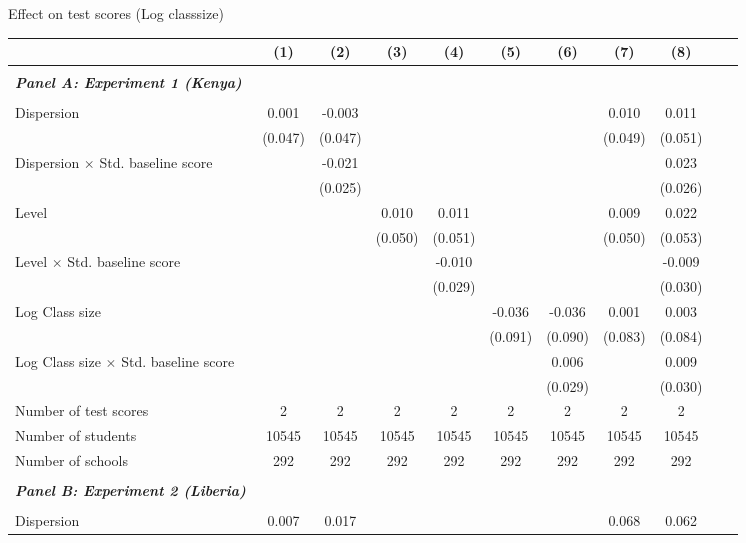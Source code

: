 \begin{center} 
\caption{\small Effect on test scores (Log classsize)} 
\label{tab:descriptives} 
\begin{scriptsize}
\begin{threeparttable}
\begin{tabular} {@{} l l c c c c c c c c c c  @{}} \toprule \toprule
& &(1)&(2)&(3)&(4)&(5)&(6)&(7)&(8) \\ \midrule 
\\
\multicolumn{3}{l}{\textbf{\textit{Panel A: Experiment 1 (Kenya)}}} \\
\\
Dispersion &  & 0.001 & -0.003 &  &  &  &  & 0.010 & 0.011 \\
                 &  & (0.047) & (0.047) &  &  &  &  & (0.049) & (0.051) \\
Dispersion $\times$ Std. baseline score &  &  & -0.021 &  &  &  &  &  & 0.023 \\
                 &  &  & (0.025) &  &  &  &  &  & (0.026) \\
Level &  &  &  & 0.010 & 0.011 &  &  & 0.009 & 0.022 \\
                 &  &  &  & (0.050) & (0.051) &  &  & (0.050) & (0.053) \\
Level $\times$ Std. baseline score &  &  &  &  & -0.010 &  &  &  & -0.009 \\
                 &  &  &  &  & (0.029) &  &  &  & (0.030) \\
Log Class size &  &  &  &  &  & -0.036 & -0.036 & 0.001 & 0.003 \\
                 &  &  &  &  &  & (0.091) & (0.090) & (0.083) & (0.084) \\
Log Class size $\times$ Std. baseline score &  &  &  &  &  &  & 0.006 &  & 0.009 \\
                 &  &  &  &  &  &  & (0.029) &  & (0.030) \\
\midrule
Number of test scores &  & 2 & 2 & 2 & 2 & 2 & 2 & 2 & 2 \\
Number of students &  & 10545 & 10545 & 10545 & 10545 & 10545 & 10545 & 10545 & 10545 \\
Number of schools &  & 292 & 292 & 292 & 292 & 292 & 292 & 292 & 292 \\
 \midrule
\\
\multicolumn{3}{l}{\textbf{\textit{Panel B: Experiment 2 (Liberia)}}} \\
\\
Dispersion &  & 0.007 & 0.017 &  &  &  &  & 0.068 & 0.062 \\

\end{tabular}
\end{threeparttable}
\end{scriptsize}
\end{center}
